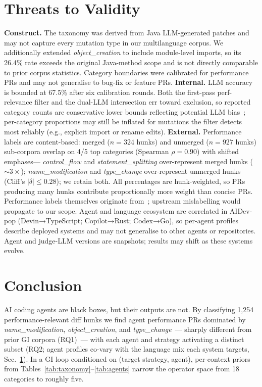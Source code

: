 \documentclass[runningheads]{llncs}
\begin{document}
\section{Threats to Validity}
\label{sec:threats}
\textbf{Construct.} The taxonomy was derived from Java LLM-generated patches and
may not capture every mutation type in our multilanguage corpus. We
additionally extended \emph{object\_creation} to include module-level
imports, so its 26.4\% rate exceeds the original Java-method scope and is
not directly comparable to prior corpus statistics. Category boundaries
were calibrated for performance PRs and may not generalise to bug-fix or
feature PRs.
\textbf{Internal.} LLM accuracy is bounded at 67.5\% after six calibration
rounds. Both the first-pass perf-relevance filter and the dual-LLM
intersection err toward exclusion, so reported category counts are
conservative lower bounds reflecting potential LLM
bias~\cite{zheng2023judging}; per-category proportions may still be
inflated for mutations the filter detects most reliably (e.g., explicit
import or rename edits).
\textbf{External.} Performance labels are content-based: merged
($n{=}324$ hunks) and unmerged ($n{=}927$ hunks) sub-corpora overlap on
4/5 top categories (Spearman $\rho{=}0.90$) with shifted emphases---
\emph{control\_flow} and \emph{statement\_splitting} over-represent
merged hunks (${\sim}3{\times}$); \emph{name\_modification} and
\emph{type\_change} over-represent unmerged hunks (Cliff's
$|\delta|\leq0.28$); we retain both. All percentages are
hunk-weighted, so PRs producing many hunks contribute proportionally
more weight than concise PRs. Performance labels themselves originate
from~\cite{peng2026agents}; upstream mislabelling would propagate to
our scope. Agent and language ecosystem are correlated in AIDev-pop
(Devin→TypeScript; Copilot→Rust; Codex→Go), so per-agent profiles
describe deployed systems and may not generalise to other agents or
repositories. Agent and judge-LLM versions are snapshots; results
may shift as these systems evolve.

\section{Conclusion}
\label{sec:conclusion}
AI coding agents are black boxes, but their outputs are not. By classifying
1{,}254 performance-relevant diff hunks we find agent performance PRs
dominated by \emph{name\_modification}, \emph{object\_creation}, and
\emph{type\_change}~--- sharply different from prior GI corpora (RQ1)~---
with each agent and strategy activating a distinct subset (RQ2;
agent profiles co-vary with the language mix each system targets,
Sec.~\ref{sec:threats}).
In a GI loop conditioned on (target strategy, agent), per-context priors
from Tables~\ref{tab:taxonomy}--\ref{tab:agents} narrow the operator space
from 18 categories to roughly five.
\end{document}

